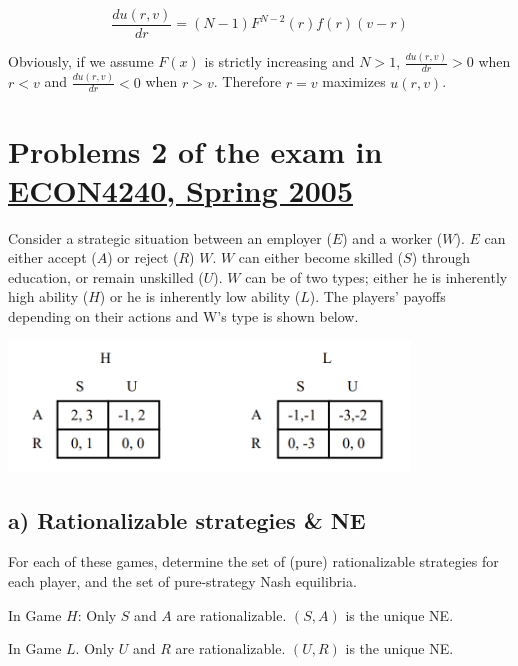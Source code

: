 \documentclass{article}
\begin{document}
\bigskip

$$\frac{du(r,v)}{dr} = (N-1)F^{N-2}(r)f(r)(v-r)$$

Obviously, if we assume $F(x)$ is strictly increasing and $N>1$,
 $\frac{du(r,v)}{dr} > 0$ when $r < v$ and $\frac{du(r,v)}{dr} < 0$ when
$r > v$. Therefore $r=v$ maximizes $u(r,v)$.




\section{Problems 2  of the exam in \href{https://www.uio.no/studier/emner/sv/oekonomi/ECON4240/previous-exams/}{ECON4240, Spring 2005}}

Consider a strategic situation between an employer ($E$) and a worker ($W$). $E$ can either accept
($A$) or reject ($R$) $W$. $W$ can either become skilled ($S$) through education, or remain unskilled
($U$). $W$ can be of two types; either he is inherently high ability ($H$) or he is inherently low
ability ($L$). The players' payoffs depending on their actions and W's type is shown below.

{\centering
\includegraphics[width=0.8\textwidth]{12.q2}
\vspace{2mm}}


\subsection*{a) Rationalizable strategies \& NE} For each of these games, determine the set of (pure) rationalizable strategies for each
player, and the set of pure-strategy Nash equilibria.

\bigskip

In Game $H$: Only $S$ and $A$ are rationalizable. $(S, A)$ is the unique NE. 

In Game $L$. Only $U$ and $R$ are rationalizable. $(U, R)$ is the unique NE.
\end{document}
